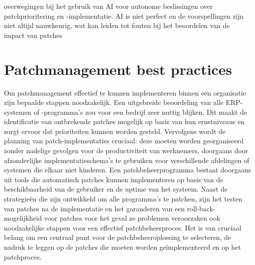overwegingen bij het gebruik van AI voor autonome beslissingen over patchprioritering en -implementatie. AI is niet perfect en de voorspellingen zijn niet altijd nauwkeurig, wat kan leiden tot fouten bij het beoordelen van de impact van patches​ \autocite{OFlaherty2023}

\section{Patchmanagement best practices}
Om patchmanagement effectief te kunnen implementeren binnen een organisatie zijn bepaalde stappen noodzakelijk. Een uitgebreide beoordeling van alle 
ERP-systemen of -programma's zou voor een bedrijf zeer nuttig blijken. Dit maakt de identificatie van ontbrekende patches mogelijk op basis van hun 
ernstniveaus en zorgt ervoor dat prioriteiten kunnen worden gesteld. Vervolgens wordt de planning van patch-implementaties cruciaal: deze moeten worden 
georganiseerd zonder nadelige gevolgen voor de productiviteit van werknemers, doorgaans door afzonderlijke implementatieschema's te gebruiken voor verschillende 
afdelingen of systemen die elkaar niet hinderen. Een patchbeheerprogramma bestaat doorgaans uit tools die automatisch patches kunnen implementeren op basis 
van de beschikbaarheid van de gebruiker en de uptime van het systeem. Naast de strategieën die zijn ontwikkeld om alle programma's te patchen, zijn het 
testen van patches na de implementatie en het garanderen van een roll-back-mogelijkheid voor patches voor het geval ze problemen veroorzaken ook noodzakelijke 
stappen voor een effectief patchbeheerproces. Het is van cruciaal belang om een ​​centraal punt voor de patchbeheeroplossing te selecteren, de nadruk te leggen 
op de patches die moeten worden geïmplementeerd en op het patchproces. \autocite{ManageEngine2024}


